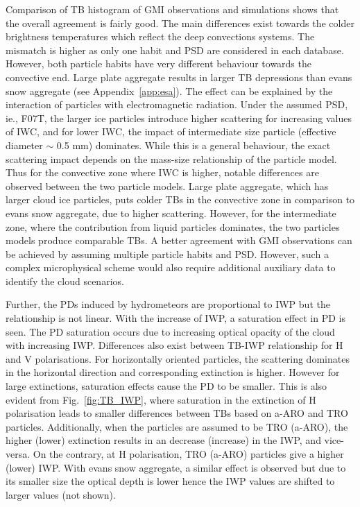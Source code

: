 \documentclass[amt, manuscript]{copernicus}
\begin{document}
Comparison of TB histogram of GMI observations and simulations shows that the overall agreement is fairly good. The main differences exist towards the colder brightness temperatures which reflect the deep convections systems. The mismatch is higher as only one habit and PSD are considered in each database. However, both particle habits have very different behaviour towards the convective end. Large plate aggregate results in larger TB depressions than evans snow aggregate (see Appendix~\ref{app:esa}). The effect can be explained by the interaction of particles with electromagnetic radiation. Under the assumed PSD, ie., F07T, the larger ice particles introduce higher scattering for increasing values of IWC, and for lower IWC, the impact of intermediate size particle (effective diameter $\sim$ 0.5\,\,mm) dominates. While this is a general behaviour, the exact scattering impact depends on the mass-size relationship of the particle model. Thus for the convective zone where IWC is higher, notable differences are observed between the two particle models. Large plate aggregate, which has larger cloud ice particles, puts colder TBs in the convective zone in comparison to evans snow aggregate, due to higher scattering. However, for the intermediate zone, where the contribution from liquid particles dominates, the two particles models produce comparable TBs. A  better agreement with GMI observations can be achieved by assuming multiple particle habits and PSD. However, such a complex microphysical scheme would also require additional auxiliary data to identify the cloud scenarios.  

Further, the PDs induced by hydrometeors are proportional to IWP but the relationship is not linear. With the increase of IWP, a saturation effect in PD is seen. The PD saturation occurs due to increasing optical opacity of the cloud with increasing IWP. Differences also exist between TB-IWP relationship for H and V polarisations. For horizontally oriented particles, the scattering dominates in the horizontal direction and corresponding extinction is higher. However for large extinctions, saturation effects cause the PD to be smaller. This is also evident from Fig.~\ref{fig:TB_IWP}, where saturation in the extinction of H  polarisation leads to smaller differences between TBs based on a-ARO and TRO particles. Additionally, when the particles are assumed to be TRO (a-ARO), the higher (lower) extinction results in an decrease (increase) in the IWP, and vice-versa. On the contrary, at H polarisation, TRO (a-ARO) particles give a higher (lower) IWP. With evans snow aggregate, a similar effect is observed but due to its smaller size the optical depth is lower hence the IWP values are shifted to larger values (not shown).
\end{document}
